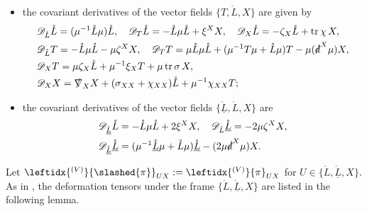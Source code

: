 \documentclass[11pt,twoside]{article}
\def\vp{\varphi}
\begin{document}
\begin{lemma}
\begin{itemize}[leftmargin=*, labelsep=6pt, itemsep=10pt]
\begin{align}
+ \frac{1}{2}G_{\tilde{T}\tilde{T}}^\gamma \slashed{d}_X\vp_\gamma)\tilde{T}^i;\label{deL}
\end{align}
\item the covariant derivatives of the vector fields $\{T, \mathring{L}, X\}$ are given by
\begin{equation}\label{cdf}
\begin{split}
&\mathscr{D}_{\mathring{L}}\mathring{L} = (\mu^{-1}\mathring{L}\mu)\mathring{L}, \quad
\mathscr{D}_{T}\mathring{L} = -\mathring{L}\mu\mathring{L} + \xi^X X, \quad
\mathscr{D}_X\mathring{L} = -\zeta_X\mathring{L} + \operatorname{tr}\chi \, X,\\
&\mathscr{D}_{\mathring{L}}T = -\mathring{L}\mu\mathring{L} - \mu\zeta^X X, \quad
\mathscr{D}_T T = \mu\mathring{L}\mu\mathring{L} + (\mu^{-1}T\mu + \mathring{L}\mu)T - \mu(\slashed{d}^X\mu) X,\\
&\mathscr{D}_X T = \mu\zeta_X\mathring{L} + \mu^{-1}\xi_X T + \mu\operatorname{tr}\sigma \, X,\\
&\mathscr{D}_X X = \slashed{\nabla}_X X + (\sigma_{XX} + \chi_{XX})\mathring{L} + \mu^{-1}\chi_{XX} T;
\end{split}
\end{equation}
\item the covariant derivatives of the vector fields $\{\mathring{\underline{L}}, \mathring{L}, X\}$ are
\begin{equation}\label{LuL}
\begin{split}
&\mathscr{D}_{\mathring{\underline{L}}}\mathring{L} = -\mathring{L}\mu\mathring{L} + 2\xi^X X, \quad
\mathscr{D}_{\mathring{L}}\mathring{\underline{L}} = -2\mu\zeta^X X,\\
&\mathscr{D}_{\mathring{\underline{L}}}\mathring{\underline{L}} = (\mu^{-1}\mathring{\underline{L}}\mu + \mathring{L}\mu)\mathring{\underline{L}} - (2\mu \slashed{d}^X\mu) X.
\end{split}
\end{equation}
\end{itemize}
\end{lemma}
Let $\leftidx{^{(V)}}{\slashed{\pi}}_{UX} := \leftidx{^{(V)}}{\pi}_{UX}$ for $U \in \{\mathring{L}, \underline{\mathring{L}}, X\}$. As in \cite[Appendix A]{Ding4}, the deformation tensors under the frame $\{\mathring{L}, \underline{\mathring{L}}, X\}$ are listed in the following lemma.
\end{document}
